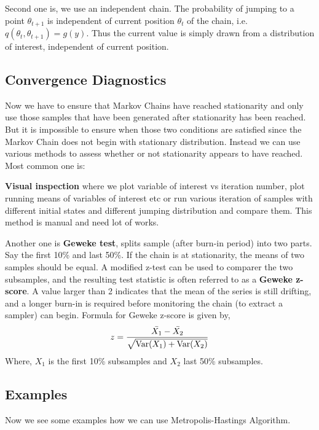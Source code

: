 Second one is, we use an independent chain. The probability of jumping to a point $ \theta_{t+1} $ is independent of current position $ \theta_t $ of the chain, i.e. $ q(\theta_t,\theta_{t+1}) = g(y) $. Thus the current value is simply drawn from a distribution of interest, independent of current position.

\subsection{Convergence Diagnostics}
Now we have to ensure that Markov Chains have reached stationarity and only use those samples that have been generated after stationarity has been reached. But it is impossible to ensure when those two conditions are satisfied since the Markov Chain does not begin with stationary distribution. Instead we can use various methods to assess whether or not stationarity appears to have reached. Most common one is:

\textbf{Visual inspection} where we plot variable of interest vs iteration number, plot running means of variables of interest etc or run various iteration of samples with different initial states and different jumping distribution and compare them. This method is manual and need lot of works.

Another one is \textbf{Geweke test}, splits sample (after burn-in period) into two parts.
Say the first 10\% and last 50\%. If the chain is at stationarity, the means of two samples should be equal. A modified z-test can be used to comparer the two subsamples,
and the resulting test statistic is often referred to as a \textbf{Geweke z-score}.
A value larger than 2 indicates that the mean of
the series is still drifting, and a longer burn-in is required before monitoring the
chain (to extract a sampler) can begin. Formula for Geweke z-score is given by,
\[
    z = \frac{\Bar{X_1} - \Bar{X_2}}{\sqrt{ \text{Var}(X_1) + \text{Var}(X_2) }}
\]
Where, $ X_1 $ is the first 10\% subsamples and $ X_2 $ last 50\% subsamples.

\subsection{Examples}

Now we see some examples how we can use Metropolis-Hastings Algorithm. 

